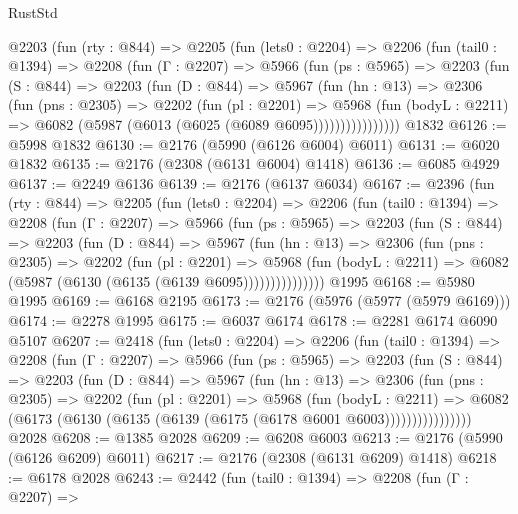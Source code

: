 \begin{lexlean}{RustStd}
\begin{coremodule}
{\begin{coremodule}
{{{{{{{{{{    @2203
      (fun (rty : @844) =>
      @2205
        (fun (lets0 : @2204) =>
        @2206
          (fun (tail0 : @1394) =>
          @2208
            (fun (Γ : @2207) =>
            @5966
              (fun (ps : @5965) =>
              @2203
                (fun (S : @844) =>
                @2203
                  (fun (D : @844) =>
                  @5967
                    (fun (hn : @13) =>
                    @2306
                      (fun (pns : @2305) =>
                      @2202
                        (fun (pl : @2201) =>
                        @5968
                          (fun (bodyL : @2211) =>
                          @6082 (@5987 (@6013 (@6025 (@6089 @6095))))))))))))))))
    @1832
@6126 := @5998 @1832
@6130 := @2176 (@5990 (@6126 @6004) @6011)
@6131 := @6020 @1832
@6135 := @2176 (@2308 (@6131 @6004) @1418)
@6136 := @6085 @4929
@6137 := @2249 @6136
@6139 := @2176 (@6137 @6034)
@6167 := @2396
    (fun (rty : @844) =>
    @2205
      (fun (lets0 : @2204) =>
      @2206
        (fun (tail0 : @1394) =>
        @2208
          (fun (Γ : @2207) =>
          @5966
            (fun (ps : @5965) =>
            @2203
              (fun (S : @844) =>
              @2203
                (fun (D : @844) =>
                @5967
                  (fun (hn : @13) =>
                  @2306
                    (fun (pns : @2305) =>
                    @2202
                      (fun (pl : @2201) =>
                      @5968
                        (fun (bodyL : @2211) =>
                        @6082 (@5987 (@6130 (@6135 (@6139 @6095)))))))))))))))
    @1995
@6168 := @5980 @1995
@6169 := @6168 @2195
@6173 := @2176 (@5976 (@5977 (@5979 @6169)))
@6174 := @2278 @1995
@6175 := @6037 @6174
@6178 := @2281 @6174 @6090 @5107
@6207 := @2418
    (fun (lets0 : @2204) =>
    @2206
      (fun (tail0 : @1394) =>
      @2208
        (fun (Γ : @2207) =>
        @5966
          (fun (ps : @5965) =>
          @2203
            (fun (S : @844) =>
            @2203
              (fun (D : @844) =>
              @5967
                (fun (hn : @13) =>
                @2306
                  (fun (pns : @2305) =>
                  @2202
                    (fun (pl : @2201) =>
                    @5968
                      (fun (bodyL : @2211) =>
                      @6082 (@6173 (@6130 (@6135 (@6139 (@6175 (@6178 @6001 @6003))))))))))))))))
    @2028
@6208 := @1385 @2028
@6209 := @6208 @6003
@6213 := @2176 (@5990 (@6126 @6209) @6011)
@6217 := @2176 (@2308 (@6131 @6209) @1418)
@6218 := @6178 @2028
@6243 := @2442
    (fun (tail0 : @1394) =>
    @2208
      (fun (Γ : @2207) =>
}}}}}}}}}}
\end{coremodule}}
\end{coremodule}
\end{lexlean}
